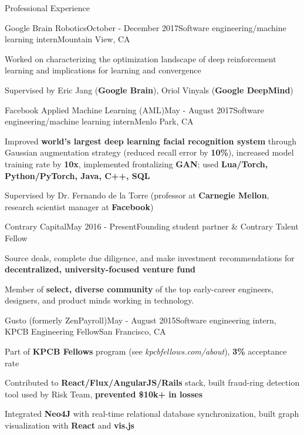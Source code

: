 \documentclass[8pt]{resume}
\begin{document}
\begin{rSection}{Professional Experience}
\begin{rSubsection}{Google Brain Robotics}{October - December 2017}{Software engineering/machine learning intern}{Mountain View, CA}
\item Worked on characterizing the optimization landscape of deep reinforcement learning and implications for learning and convergence
\item Supervised by Eric Jang (\textbf{Google Brain}), Oriol Vinyals (\textbf{Google DeepMind})
\end{rSubsection}


\begin{rSubsection}{Facebook Applied Machine Learning (AML)}{May - August 2017}{Software engineering/machine learning intern}{Menlo Park, CA}
\item Improved \textbf{world's largest deep learning facial recognition system} through Gaussian augmentation strategy (reduced recall error by \textbf{10\%}), increased model training rate by \textbf{10x}, implemented frontalizing \textbf{GAN}; used \textbf{Lua/Torch, Python/PyTorch, Java, C++, SQL}
\item Supervised by Dr. Fernando de la Torre (professor at \textbf{Carnegie Mellon}, research scientist manager at \textbf{Facebook})
\end{rSubsection}


\begin{rSubsection}{Contrary Capital}{May 2016 - Present}{Founding student partner \& Contrary Talent Fellow}{}
\item Source deals, complete due diligence, and make investment recommendations for \textbf{decentralized, university-focused venture fund}
\item Member of \textbf{select, diverse community} of the top early-career engineers, designers, and product minds working in technology.
\end{rSubsection}

\begin{rSubsection}{Gusto (formerly ZenPayroll)}{May - August 2015}{Software engineering intern, KPCB Engineering Fellow}{San Francisco, CA}
\item Part of \textbf{KPCB Fellows} program (see {\it kpcbfellows.com/about}), \textbf{3\%} acceptance rate
\item Contributed to \textbf{React/Flux/AngularJS/Rails} stack, built fraud-ring detection tool used by Risk Team, \textbf{prevented \$10k+ in losses}
\item Integrated \textbf{Neo4J} with real-time relational database synchronization, built graph visualization with \textbf{React} and \textbf{vis.js}
\end{rSubsection}


\end{rSection}
\end{document}
